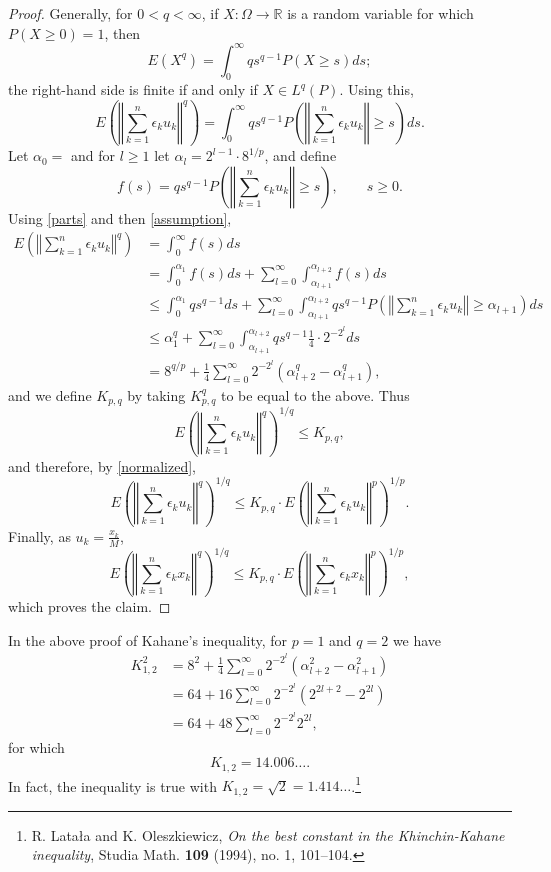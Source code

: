 \documentclass{article}
\newcommand{\norm}[1]{\left\Vert #1 \right\Vert}
\theoremstyle{definition}
\begin{document}
\begin{proof}
Generally, for $0<q<\infty$, if $X:\Omega \to \mathbb{R}$ is a random variable for which
$P(X \geq 0)=1$, then
\[
E(X^q) = \int_0^\infty q s^{q-1} P(X \geq s) ds;
\]
the right-hand side is finite if and only if $X \in L^q(P)$. 
Using this,
\begin{equation}
E\left(\norm{\sum_{k=1}^n \epsilon_k u_k}^q\right) = 
\int_0^\infty qs^{q-1} P\left(\norm{\sum_{k=1}^n \epsilon_k u_k} \geq s\right) ds.
\label{parts}
\end{equation}
Let $\alpha_0=$ and for $l \geq 1$ let $\alpha_l=2^{l-1} \cdot 8^{1/p}$, and define
\[
f(s) = q s^{q-1} P\left(\norm{\sum_{k=1}^n \epsilon_k u_k} \geq s\right), \qquad s \geq 0.
\]
Using \eqref{parts} and then \eqref{assumption},
\begin{align*}
E\left(\norm{\sum_{k=1}^n \epsilon_k u_k}^q\right)&=\int_0^\infty f(s) ds\\
&=\int_0^{\alpha_1} f(s) ds
+
\sum_{l=0}^\infty 
\int_{\alpha_{l+1}}^{\alpha_{l+2}} f(s) ds\\
&\leq \int_0^{\alpha_1} qs^{q-1} ds + \sum_{l=0}^\infty \int_{\alpha_{l+1}}^{\alpha_{l+2}} qs^{q-1} P\left(\norm{\sum_{k=1}^n \epsilon_k u_k} \geq 
\alpha_{l+1}\right) ds\\
&\leq \alpha_1^q  +  \sum_{l=0}^\infty \int_{\alpha_{l+1}}^{\alpha_{l+2}} qs^{q-1} \frac{1}{4} \cdot 2^{-2^l} ds\\
&=8^{q/p} + \frac{1}{4} \sum_{l=0}^\infty 2^{-2^l} (\alpha_{l+2}^q-\alpha_{l+1}^q),
\end{align*}
and we define $K_{p,q}$ by taking $K_{p,q}^q$ to be equal to the above.
Thus
\[
E\left(\norm{\sum_{k=1}^n \epsilon_k u_k}^q\right)^{1/q} \leq K_{p,q},
\]
and therefore, by \eqref{normalized},
\[
E\left(\norm{\sum_{k=1}^n \epsilon_k u_k}^q\right)^{1/q} \leq K_{p,q} \cdot
E\left(\norm{\sum_{k=1}^n \epsilon_k u_k}^p \right)^{1/p}.
\]
Finally, as $u_k = \frac{x_k}{M}$,
\[
E\left(\norm{\sum_{k=1}^n \epsilon_k x_k}^q\right)^{1/q} \leq K_{p,q} \cdot
E\left(\norm{\sum_{k=1}^n \epsilon_k x_k}^p \right)^{1/p},
\]
which proves the claim.
\end{proof}

In the above proof of Kahane's inequality, for $p=1$ and $q=2$ we have
\begin{align*}
K_{1,2}^2 &= 8^2 + \frac{1}{4} \sum_{l=0}^\infty 2^{-2^l}(\alpha_{l+2}^2-\alpha_{l+1}^2)\\
&=64+16\sum_{l=0}^\infty 2^{-2^l} (2^{2l+2}-2^{2l})\\
&=64+48\sum_{l=0}^\infty 2^{-2^l} 2^{2l},
\end{align*}
for which 
\[
K_{1,2} = 14.006\ldots.
\]
In fact, the inequality is true with $K_{1,2}=\sqrt{2}=1.414\ldots$.\footnote{R. Lata\l{}a and 
K. Oleszkiewicz, 
{\em On the best constant in the Khinchin-Kahane inequality}, Studia Math. \textbf{109} (1994), no. 1,
101--104.}
\end{document}
